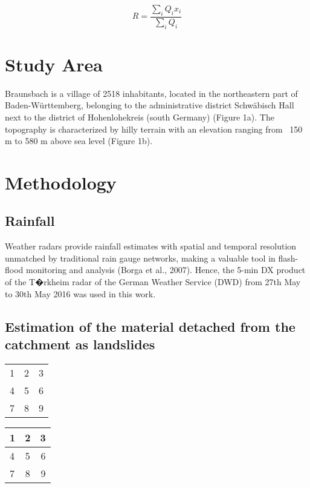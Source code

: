 \documentclass[10pt]{article}
\begin{document}
\begin{equation}
R=\frac{\sum_{i} Q_{i} x_i}{\sum_{i} Q_i}
\end{equation}

\section{Study Area}

Braunsbach is a village of 2518 inhabitants, located in the northeastern part of Baden-W{\"u}rttemberg, belonging to the administrative district Schw{\"a}bisch Hall next to the district of Hohenlohekreis (south Germany) (Figure 1a). The topography is characterized by hilly terrain with an elevation ranging from ~150 m to 580 m above sea level (Figure 1b).

\section{Methodology}

\subsection{Rainfall}

Weather radars provide rainfall estimates with spatial and temporal resolution unmatched by traditional rain gauge networks, making a valuable tool in flash-flood monitoring and analysis (Borga et al., 2007). Hence, the 5-min DX product of the T�rkheim radar of the German Weather Service (DWD) from 27th May to 30th May 2016 was used in this work. 


\subsection{Estimation of the material detached from the catchment as landslides}

\begin{tabular}{ l c r }
  1 & 2 & 3 \\
  4 & 5 & 6 \\
  7 & 8 & 9 \\
\end{tabular}


\begin{tabular}{ l | c | r }
\hline
  1 & 2 & 3 \\ \hline
  4 & 5 & 6 \\
  7 & 8 & 9 \\
\hline
\end{tabular}
\end{document}
